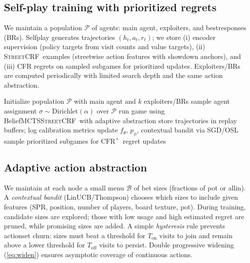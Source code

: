 \documentclass[10pt]{article}
\newcommand{\sCRF}{\textsc{Street\textendash CRF}\xspace} %
\newcommand{\CFRplus}{\ensuremath{\mathrm{CFR}^{+}}\xspace}
\newcommand{\1}{\mathbf{1}}
\theoremstyle{plain}
\begin{document}
\subsection{Self-play training with prioritized regrets}
We maintain a population $\mathcal{P}$ of agents: main agent, exploiters, and best\textendash responses (BRs). Self\textendash play generates trajectories $(h_t,a_t,r_t)$; we store (i) encoder supervision (policy targets from visit counts and value targets), (ii) \sCRF\ examples (street\textendash wise action features with showdown anchors), and (iii) CFR regrets on sampled subgames for prioritized updates. Exploiters/BRs are computed periodically with limited search depth and the same action abstraction.

\begin{algorithm}[t]
\caption{Population self\textendash play with prioritized regrets}
\label{alg:selfplay}
\begin{algorithmic}[1]
\State Initialize population $\mathcal{P}$ with main agent and $k$ exploiters/BRs
     \State sample agent assignment $\sigma \sim \mathrm{Dirichlet}(\alpha)$ over $\mathcal{P}$
     \State run game using Belief\textendash MCTS\textendash \sCRF\ with adaptive abstraction
     \State store trajectories in replay buffers; log calibration metrics
  \EndFor
  \State update $f_\theta$, $p_\phi$, contextual bandit via SGD/OSL
  \State sample prioritized subgames for \CFRplus\ regret updates
\EndWhile
\end{algorithmic}
\end{algorithm}

\subsection{Adaptive action abstraction}
\label{sec:adaptive_abstraction}
We maintain at each node a small menu $\mathcal{B}$ of bet sizes (fractions of pot or all\textendash in). A \emph{contextual bandit} (LinUCB/Thompson) chooses which sizes to include given features (SPR, position, number of players, board texture, pot). During training, candidate sizes are explored; those with low usage and high estimated regret are pruned, while promising sizes are added. A simple \emph{hysteresis} rule prevents action\textendash set churn: sizes must beat a threshold for $T_\text{on}$ visits to join and remain above a lower threshold for $T_\text{off}$ visits to persist. Double progressive widening (\cref{eq:widen}) ensures asymptotic coverage of continuous actions.
\end{document}
